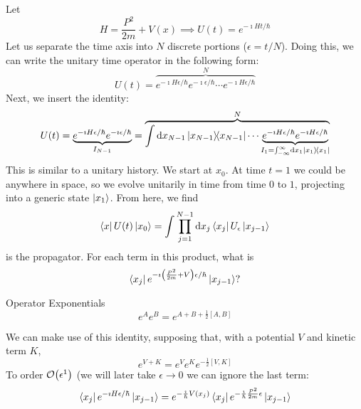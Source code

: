 \documentclass[a4paper,twoside,master.tex]{subfiles}
\begin{document}
Let
\begin{equation}
    H = \frac{P^2}{2m} + V(x) \implies U(t) = e^{-\imath Ht/\hbar}
\end{equation}
Let us separate the time axis into $ N $ discrete portions ($ \epsilon = t/N $). Doing this, we can write the unitary time operator in the following form:
\begin{equation}
    U(t) = \overbrace{ e^{-\imath H \epsilon / \hbar} e^{-\imath \epsilon / \hbar} \cdots e^{-\imath H \epsilon / \hbar} }^{N}
\end{equation}
Next, we insert the identity:
\begin{equation}
    U(t) = \underbrace{e^{-\imath H \epsilon / \hbar} e^{-\imath \epsilon / \hbar}}_{I_{N-1}} =\overbrace{ \int\dd{x_{N-1}}\op{x_{N-1}} \cdots \underbrace{e^{-\imath H \epsilon / \hbar} e^{-\imath H \epsilon / \hbar}}_{I_1 = \int_{-\infty}^{\infty} \dd{x_1}\op{x_1}} }^{N}
\end{equation}
This is similar to a unitary history. We start at $ x_0 $. At time $ t=1 $ we could be anywhere in space, so we evolve unitarily in time from time $ 0 $ to $ 1 $, projecting into a generic state $ \ket{x_1} $. From here, we find
\begin{equation}
    \bra{x} U(t) \ket{x_0} = \int \prod_{j=1}^{N-1} \dd{x_j} \bra{x_j} U_{\epsilon} \ket{x_{j-1}}
\end{equation}
is the propagator. For each term in this product, what is
\begin{equation}
    \bra{x_j} e^{-\imath \left( \frac{P^2}{2m} + V \right)\epsilon/\hbar} \ket{x_{j-1}}?
\end{equation}
\begin{note}{Operator Exponentials}
    \begin{equation}
        e^{A} e^{B} = e^{A + B + \frac{1}{2} [A,B]}
    \end{equation}
\end{note}
We can make use of this identity, supposing that, with a potential $ V $ and kinetic term $ K $,
\begin{equation}
    e^{V+K} = e^{V} e^{K} e^{- \frac{1}{2} [V,K]}
\end{equation}
To order $ \order{\epsilon^{1}} $ (we will later take $ \epsilon \to 0 $ we can ignore the last term:
\begin{equation}
    \bra{x_{j}} e^{-\imath H \epsilon / \hbar} \ket{x_{j-1}} = e^{- \frac{\imath}{\hbar} V(x_j)} \bra{x_j} e^{- \frac{\imath}{\hbar} \frac{P^2}{2m} \epsilon} \ket{x_{j-1}}
\end{equation}
\end{document}
